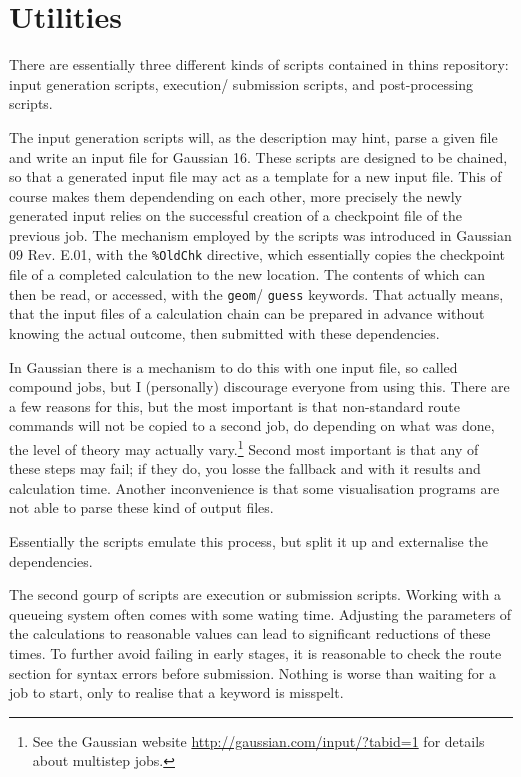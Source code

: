 \documentclass[   %
  final,          %
  a4paper         %
]{article}
\begin{document}
\section{Utilities}

There are essentially three different kinds of scripts contained in thins repository:
input generation scripts, execution/ submission scripts, and post-processing scripts.

The input generation scripts will, as the description may hint,
parse a given file and write an input file for Gaussian 16.
These scripts are designed to be chained, 
so that a generated input file may act as a template for a new input file. 
This of course makes them dependending on each other,
more precisely the newly generated input relies on the successful creation
of a checkpoint file of the previous job.
The mechanism employed by the scripts was introduced in Gaussian 09 Rev. E.01,
with the \texttt{\%OldChk} directive, which essentially copies the checkpoint file
of a completed calculation to the new location.
The contents of which can then be read, or accessed, with the \texttt{geom}/ \texttt{guess} keywords.
That actually means, that the input files of a calculation chain can be
prepared in advance without knowing the actual outcome,
then submitted with these dependencies.

In Gaussian there is a mechanism to do this with one input file,
so called compound jobs, but I (personally) discourage everyone from using this.
There are a few reasons for this, but the most important is that non-standard 
route commands will not be copied to a second job,
do depending on what was done, the level of theory may actually vary.\footnote{%
  See the Gaussian website 
  \href{http://gaussian.com/input/}{http://gaussian.com/input/?tabid=1}
  for details about multistep jobs.}
Second most important is that any of these steps may fail;
if they do, you losse the fallback and with it results and calculation time.
Another inconvenience is that some visualisation programs are not able to
parse these kind of output files.

Essentially the scripts emulate this process, but split it up and externalise the dependencies.

The second gourp of scripts are execution or submission scripts.
Working with a queueing system often comes with some wating time.
Adjusting the parameters of the calculations to reasonable values
can lead to significant reductions of these times.
To further avoid failing in early stages, it is reasonable to check the route section
for syntax errors before submission.
Nothing is worse than waiting for a job to start, only to realise that a keyword is misspelt.
\end{document}
